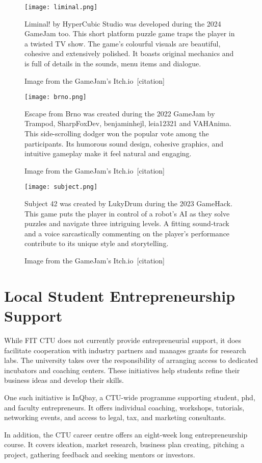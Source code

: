 \begin{figure}[H]
    \texttt{[image: liminal.png]}
    \caption{Image from the GameJam's Itch.io~[citation]}
    \label{fig:liminal-picture}
    Liminal! by HyperCubic Studio was developed during the 2024 GameJam too. This short platform puzzle game traps the player in a twisted TV show. The game’s colourful visuals are beautiful, cohesive and extensively polished. It boasts original mechanics and is full of details in the sounds, menu items and dialogue.
\end{figure}

\begin{figure}[H]
    \texttt{[image: brno.png]}
    \caption{Image from the GameJam's Itch.io~[citation]}
    \label{fig:brno-picture}
    Escape from Brno was created during the 2022 GameJam by Trampod, SharpFoxDev, benjaminhejl, leia12321 and VAHAnima. This side-scrolling dodger won the popular vote among the participants. Its humorous sound design, cohesive graphics, and intuitive gameplay make it feel natural and engaging.
\end{figure}

\begin{figure}[H]
    \texttt{[image: subject.png]}
    \caption{Image from the GameJam's Itch.io~[citation]}
    \label{fig:subject-picture}
    Subject 42 was created by LukyDrum during the 2023 GameHack. This game puts the player in control of a robot’s AI as they solve puzzles and navigate three intriguing levels. A fitting sound-track and a voice sarcastically commenting on the player’s performance contribute to its unique style and storytelling.
\end{figure}

\section{Local Student Entrepreneurship Support}
While FIT CTU does not currently provide entrepreneurial support, it does facilitate cooperation with industry partners and manages grants for research labs. The university takes over the responsibility of arranging access to dedicated incubators and coaching centers. These initiatives help students refine their business ideas and develop their skills.

One such initiative is InQbay, a CTU-wide programme supporting student, phd, and faculty entrepreneurs. It offers individual coaching, workshops, tutorials, networking events, and access to legal, tax, and marketing consultants.

In addition, the CTU career centre offers an eight-week long entrepreneurship course. It covers ideation, market research, business plan creating, pitching a project, gathering feedback and seeking mentors or investors.
